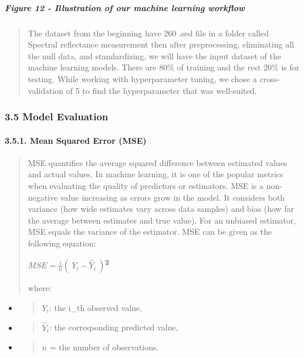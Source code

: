 \documentclass[
]{article}
\begin{document}
\hypertarget{figure-12---illustration-of-our-machine-learning-workflow}{%
\subparagraph{\texorpdfstring{\textbf{Figure 12} - Illustration of our
machine learning
workflow}{Figure 12 - Illustration of our machine learning workflow}}\label{figure-12---illustration-of-our-machine-learning-workflow}}

\begin{quote}
The dataset from the beginning have 260 .sed file in a folder called
Spectral reflectance measurement then after preprocessing, eliminating
all the null data, and standardizing, we will have the input dataset of
the machine learning models. There are 80\% of training and the rest
20\% is for testing. While working with hyperparameter tuning, we chose
a cross-validation of 5 to find the hyperparameter that was well-suited.
\end{quote}

\hypertarget{model-evaluation}{%
\subsubsection{\texorpdfstring{\textbf{3.5 Model
Evaluation}}{3.5 Model Evaluation}}\label{model-evaluation}}

\hypertarget{mean-squared-error-mse}{%
\paragraph{\texorpdfstring{\textbf{3.5.1. Mean Squared Error
(MSE)}}{3.5.1. Mean Squared Error (MSE)}}\label{mean-squared-error-mse}}

\begin{quote}
MSE quantifies the average squared difference between estimated values
and actual values. In machine learning, it is one of the popular metrics
when evaluating the quality of predictors or estimators. MSE is a
non-negative value increasing as errors grow in the model. It considers
both variance (how wide estimates vary across data samples) and bias
(how far the average between estimates and true value). For an unbiased
estimator, MSE equals the variance of the estimator. MSE can be given as
the following equation:

\(MSE = \frac{1}{n}({\ Y}_{i} - {\widehat{Y}}_{i}\ )\)\textbf{\textsuperscript{2}}

where:
\end{quote}

\begin{itemize}
\item
  \begin{quote}
  \(Y_{i}\): the i\_th observed value,
  \end{quote}
\item
  \begin{quote}
  \({\widehat{Y}}_{i}\): the corresponding predicted value,
  \end{quote}
\item
  \begin{quote}
  \(n\) = the number of observations.
  \end{quote}
\end{itemize}
\end{document}
